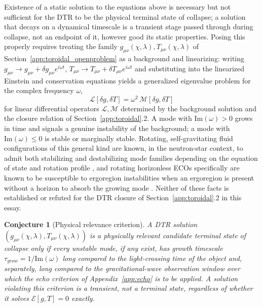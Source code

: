 \documentclass[11pt]{article}
\newtheorem{conjecture}{Conjecture}
\begin{document}
Existence of a static solution to the equations above is necessary but not sufficient for the DTR to be the physical terminal state of collapse; a solution that decays on a dynamical timescale is a transient stage passed through during collapse, not an endpoint of it, however good its static properties. Posing this properly requires treating the family $g_{\mu\nu}(\chi,\lambda), T_{\mu\nu}(\chi,\lambda)$ of Section~\ref{app:toroidal_openproblem} as a background and linearizing: writing $g_{\mu\nu}\to g_{\mu\nu}+\delta g_{\mu\nu}e^{i\omega t}$, $T_{\mu\nu}\to T_{\mu\nu}+\delta T_{\mu\nu}e^{i\omega t}$ and substituting into the linearized Einstein and conservation equations yields a generalized eigenvalue problem for the complex frequency $\omega$,
\begin{equation}
\mathcal{L}[\delta g,\delta T] = \omega^2\,\mathcal{M}[\delta g,\delta T]
\end{equation}
for linear differential operators $\mathcal{L},\mathcal{M}$ determined by the background solution and the closure relation of Section~\ref{app:toroidal}.2. A mode with $\mathrm{Im}(\omega)>0$ grows in time and signals a genuine instability of the background; a mode with $\mathrm{Im}(\omega)\leq0$ is stable or marginally stable. Rotating, self-gravitating fluid configurations of this general kind are known, in the neutron-star context, to admit both stabilizing and destabilizing mode families depending on the equation of state and rotation profile \cite{stergioulas2003,friedmanstergioulas2013}, and rotating horizonless ECOs specifically are known to be susceptible to ergoregion instabilities when an ergoregion is present without a horizon to absorb the growing mode \cite{cardosopani2019}. Neither of these facts is established or refuted for the DTR closure of Section~\ref{app:toroidal}.2 in this essay.

\begin{conjecture}[Physical relevance criterion]
A DTR solution $\left(g_{\mu\nu}(\chi,\lambda),T_{\mu\nu}(\chi,\lambda)\right)$ is a physically relevant candidate terminal state of collapse only if every unstable mode, if any exist, has growth timescale $\tau_{grow} = 1/\mathrm{Im}(\omega)$ long compared to the light-crossing time of the object and, separately, long compared to the gravitational-wave observation window over which the echo criterion of Appendix~\ref{app:echo} is to be applied. A solution violating this criterion is a transient, not a terminal state, regardless of whether it solves $\mathcal{E}[g,T]=0$ exactly.
\end{conjecture}
\end{document}
